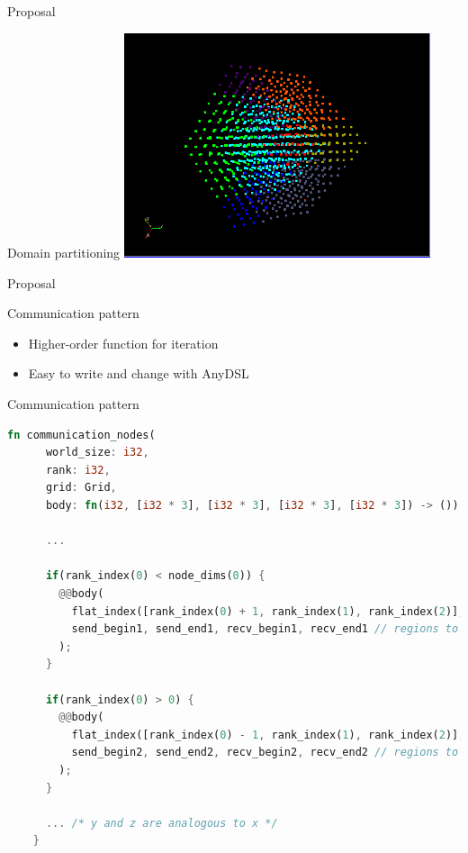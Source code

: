 \documentclass[aspectratio=43,t]{beamer}
\begin{document}
  \begin{frame}{Proposal}
    \begin{block}{Domain partitioning}
      \includegraphics[width=9cm]{domain_partitioning.png}
    \end{block}
  \end{frame}

  \begin{frame}{Proposal}
    \begin{block}{Communication pattern}
      \begin{itemize}
        \item Higher-order function for iteration
        \item Easy to write and change with AnyDSL
      \end{itemize}
    \end{block}
  \end{frame}

  \begin{frame}[fragile]{Communication pattern}
    \begin{lstlisting}[basicstyle=\tiny\ttfamily,language=Rust]
    fn communication_nodes(
      world_size: i32,
      rank: i32,
      grid: Grid,
      body: fn(i32, [i32 * 3], [i32 * 3], [i32 * 3], [i32 * 3]) -> ()) -> () {

      ...

      if(rank_index(0) < node_dims(0)) {
        @@body(
          flat_index([rank_index(0) + 1, rank_index(1), rank_index(2)], ...),
          send_begin1, send_end1, recv_begin1, recv_end1 // regions to communicate
        );     
      }

      if(rank_index(0) > 0) {
        @@body(
          flat_index([rank_index(0) - 1, rank_index(1), rank_index(2)], ...),
          send_begin2, send_end2, recv_begin2, recv_end2 // regions to communicate
        );     
      }

      ... /* y and z are analogous to x */
    }
    \end{lstlisting}
  \end{frame}
\end{document}
